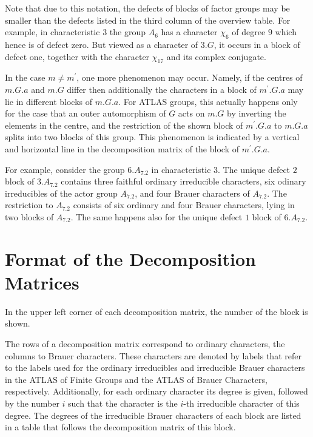 \documentclass[a4paper]{article}
\def\ATLAS{\textsc{ATLAS}}
\begin{document}
Note that due to this notation, the defects of blocks of factor groups
may be smaller than the defects listed in the third column of the
overview table.
For example, in characteristic $3$ the group $A_6$ has a character
$\chi_6$ of degree $9$ which hence is of defect zero.
But viewed as a character of $3.G$, it occurs in a block of defect one,
together with the character $\chi_{17}$ and its complex conjugate.

In the case $m \not= m^{\prime}$, one more phenomenon may occur.
Namely, if the centres of $m.G.a$ and $m.G$ differ then additionally
the characters in a block of $m^{\prime}.G.a$ may lie in different blocks
of $m.G.a$.
For {\ATLAS} groups, this actually happens only for the case that an
outer automorphism of $G$ acts on $m.G$ by inverting the elements in the
centre,
and the restriction of the shown block of $m^{\prime}.G.a$ to $m.G.a$
splits into two blocks of this group.
This phenomenon is indicated by a vertical and horizontal line in the
decomposition matrix of the block of $m^{\prime}.G.a$.

For example, consider the group $6.A_7.2$ in characteristic $3$.
The unique defect $2$ block of $3.A_7.2$ contains three faithful ordinary
irreducible characters, six odinary irreducibles of the actor group
$A_7.2$, and four Brauer characters of $A_7.2$.
The restriction to $A_7.2$ consists of six ordinary and four Brauer
characters, lying in two blocks of $A_7.2$.
The same happens also for the unique defect $1$ block of $6.A_7.2$.


\section{Format of the Decomposition Matrices}

In the upper left corner of each decomposition matrix,
the number of the block is shown.

The rows of a decomposition matrix correspond to ordinary characters,
the columns to Brauer characters.
These characters are denoted by labels
that refer to the labels used for the ordinary irreducibles and
irreducible Brauer characters in the {\ATLAS} of Finite Groups
and the {\ATLAS} of Brauer Characters, respectively.
Additionally, for each ordinary character its degree is given,
followed by the number $i$ such that the character is the $i$-th
irreducible character of this degree.
The degrees of the irreducible Brauer characters of each block are
listed in a table that follows the decomposition matrix of this block.
\end{document}
